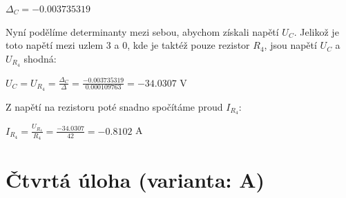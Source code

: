 \documentclass[12pt]{article}
\begin{document}
\begin{center}
$\Delta_C=-0.003735319$\\
\vspace{10px}

\normalsize
Nyní podělíme determinanty mezi sebou, abychom získali napětí $U_C$. Jelikož je toto napětí mezi uzlem 3 a 0, kde je taktéž pouze rezistor $R_4$, jsou napětí $U_C$ a $U_{R_4}$ shodná:\\
\vspace{15px}

\Large
$U_C=U_{R_4}=\frac{\Delta_C}{\Delta}=\frac{-0.003735319}{0.000109763}=-34.0307$ V\\
\vspace{15px}

\normalsize
Z napětí na rezistoru poté snadno spočítáme proud $I_{R_4}$:\\
\vspace{15px}

\Large
$I_{R_4}=\frac{U_{R_4}}{R_4}=\frac{-34.0307}{42}=-0.8102$ A\\

\end{center}
\clearpage

\section{Čtvrtá úloha (varianta: A)}
\end{document}
